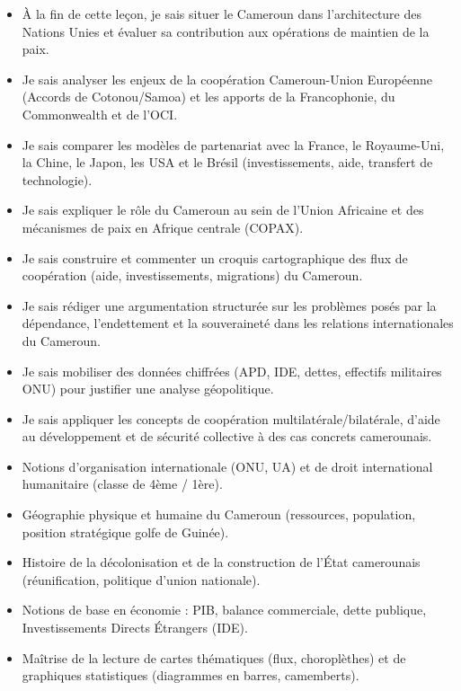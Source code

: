 \documentclass[11pt]{article}
\begin{document}
\begin{objectifs}
\begin{itemize}
\item À la fin de cette leçon, je sais situer le Cameroun dans l'architecture des Nations Unies et évaluer sa contribution aux opérations de maintien de la paix.
\item Je sais analyser les enjeux de la coopération Cameroun-Union Européenne (Accords de Cotonou/Samoa) et les apports de la Francophonie, du Commonwealth et de l'OCI.
\item Je sais comparer les modèles de partenariat avec la France, le Royaume-Uni, la Chine, le Japon, les USA et le Brésil (investissements, aide, transfert de technologie).
\item Je sais expliquer le rôle du Cameroun au sein de l'Union Africaine et des mécanismes de paix en Afrique centrale (COPAX).
\item Je sais construire et commenter un croquis cartographique des flux de coopération (aide, investissements, migrations) du Cameroun.
\item Je sais rédiger une argumentation structurée sur les problèmes posés par la dépendance, l'endettement et la souveraineté dans les relations internationales du Cameroun.
\item Je sais mobiliser des données chiffrées (APD, IDE, dettes, effectifs militaires ONU) pour justifier une analyse géopolitique.
\item Je sais appliquer les concepts de coopération multilatérale/bilatérale, d'aide au développement et de sécurité collective à des cas concrets camerounais.
\end{itemize}
\end{objectifs}

\begin{prerequis}
\begin{itemize}
\item Notions d'organisation internationale (ONU, UA) et de droit international humanitaire (classe de 4ème / 1ère).
\item Géographie physique et humaine du Cameroun (ressources, population, position stratégique golfe de Guinée).
\item Histoire de la décolonisation et de la construction de l'État camerounais (réunification, politique d'union nationale).
\item Notions de base en économie : PIB, balance commerciale, dette publique, Investissements Directs Étrangers (IDE).
\item Maîtrise de la lecture de cartes thématiques (flux, choroplèthes) et de graphiques statistiques (diagrammes en barres, camemberts).
\end{itemize}
\end{prerequis}
\end{document}
